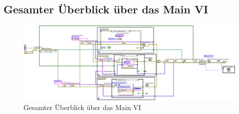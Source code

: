 	
	\subsection{Gesamter Überblick über das Main VI}
	\begin{figure}[!ht]
	\centering
		\includegraphics[angle=90, height=0.85\textheight]{Pics/PLS-Main-all.png}
	\caption{Gesamter Überblick über das Main VI}
	\label{fig:a14}
	\end{figure}
%	
%	
%	
%	
